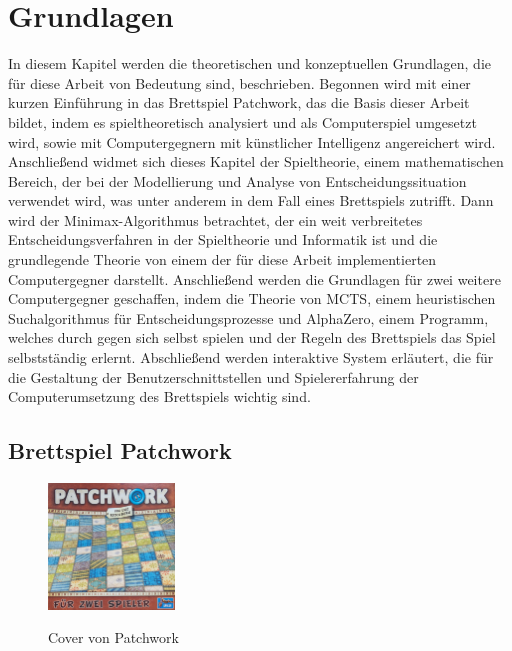 \chapter{Grundlagen}
\label{chapter:grundlagen}

In diesem Kapitel werden die theoretischen und konzeptuellen Grundlagen, die für diese Arbeit von Bedeutung sind, beschrieben. Begonnen wird mit einer kurzen Einführung in das Brettspiel Patchwork, das die Basis dieser Arbeit bildet, indem es spieltheoretisch analysiert und als Computerspiel umgesetzt wird, sowie mit Computergegnern mit künstlicher Intelligenz angereichert wird. Anschließend widmet sich dieses Kapitel der Spieltheorie, einem mathematischen Bereich, der bei der Modellierung und Analyse von Entscheidungssituation verwendet wird, was unter anderem in dem Fall eines Brettspiels zutrifft. Dann wird der Minimax-Algorithmus betrachtet, der ein weit verbreitetes Entscheidungsverfahren in der Spieltheorie und Informatik ist und die grundlegende Theorie von einem der für diese Arbeit implementierten Computergegner darstellt. Anschließend werden die Grundlagen für zwei weitere Computergegner geschaffen, indem die Theorie von \acl{MCTS}, einem heuristischen Suchalgorithmus für Entscheidungsprozesse und AlphaZero, einem Programm, welches durch gegen sich selbst spielen und der Regeln des Brettspiels das Spiel selbstständig erlernt. Abschließend werden interaktive System erläutert, die für die Gestaltung der Benutzerschnittstellen und Spielererfahrung der Computerumsetzung des Brettspiels wichtig sind.

\section{Brettspiel Patchwork}
\label{chapter:brettspiel-patchwork}

\begin{figure}
    \centering
    \vspace*{-0.4cm}
    \includegraphics[width=0.3\textwidth]{res/pictures/assets/patchwork-cover.png}
    \caption[Cover von Patchwork]{\unskip}
    Cover von Patchwork
    \label{fig:patchwork-cover}
    \vspace*{-2cm}
\end{figure}


